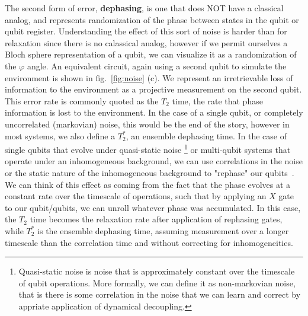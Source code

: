 The second form of error, \textbf{dephasing}, is one that does NOT have a classical analog, and represents randomization of the phase between
states in the qubit or qubit register. Understanding the effect of this sort of noise is harder than for relaxation since there is no
calassical analog, however if we permit ourselves a Bloch sphere representation of a qubit, we can visualize it
as a randomization of the $\varphi$ angle. An equivalent circuit, again using a second qubit to simulate the
environment is shown in fig.~\ref{fig:noise} (c). We represent an irretrievable loss of information to the
environment as a projective measurement on the second qubit. This error rate is commonly quoted as the $T_2$ time,
the rate that phase information is lost to the environment. In the case of a single qubit, or completely uncorrelated
(markovian) noise, this would be the end of the story, however in most systems, we also define a $T_2^*$, an ensemble
dephasing time. In the case of single qubits that evolve under quasi-static noise
\footnote{Quasi-static noise is noise that is approximately constant over the timescale of qubit operations. More formally,
we can define it as non-markovian noise, that is there is some correlation in the noise that we can learn and correct
by appriate application of dynamical decoupling.} or multi-qubit systems that operate
under an inhomogeneous background, we can use correlations in the noise or the static nature of the inhomogeneous background
to "rephase" our qubits~\cite{PhysRev.80.580,dynamic-decoupling-biercuk}. We can think of this effect as coming from the
fact that the phase evolves at a constant rate over the timescale of operations, such that by applying an $X$ gate to our
qubit/qubits, we can unroll whatever phase was accumulated.  In this case, the $T_2$ time becomes the relaxation rate after
application of rephasing gates, while $T_2^*$ is the ensemble dephasing time, assuming measurement over a longer timescale
than the correlation time and without correcting for inhomogeneities.


